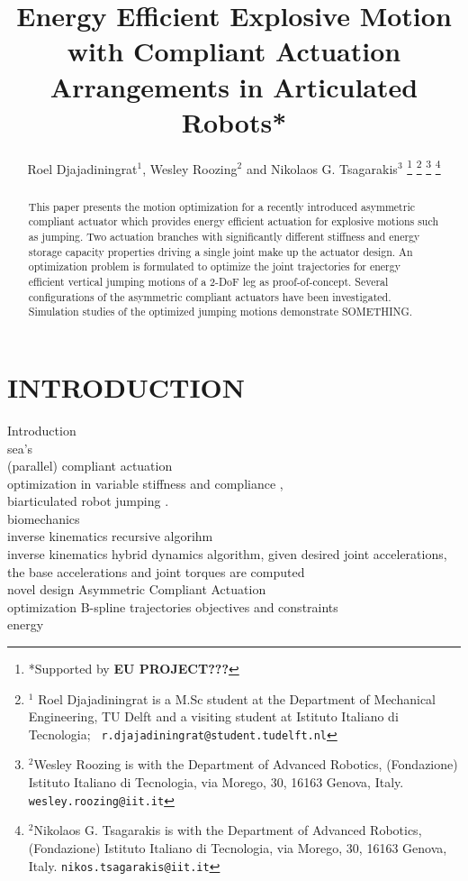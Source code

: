 \documentclass[letterpaper, 10 pt, conference]{ieeeconf}  %
\title{\LARGE \bf
Energy Efficient Explosive Motion with Compliant Actuation Arrangements in Articulated Robots*
}
\author{Roel Djajadiningrat$^{1}$, Wesley Roozing$^{2}$ and Nikolaos G. Tsagarakis$^{3}$%
\thanks{*Supported by \textbf{EU PROJECT???} }%
\thanks{$^{1}$ Roel Djajadiningrat is a M.Sc student at the Department of Mechanical Engineering, TU Delft and a visiting student at Istituto Italiano di Tecnologia;
        {\tt\ r.djajadiningrat@student.tudelft.nl}
  }%
\thanks{$^{2}$Wesley Roozing is with the Department of Advanced Robotics,
	(Fondazione) Istituto Italiano di Tecnologia, via Morego,
	30, 16163 Genova, Italy.
        {\tt\small wesley.roozing@iit.it}
     }%
\thanks{$^{2}$Nikolaos G. Tsagarakis is with the Department of Advanced Robotics,
	(Fondazione) Istituto Italiano di Tecnologia, via Morego,
	30, 16163 Genova, Italy.
	{\tt\small nikos.tsagarakis@iit.it}        
    }%
}
\begin{document}
\maketitle
\thispagestyle{empty}
\pagestyle{empty}


\begin{abstract}

This paper presents the motion optimization for a recently introduced asymmetric compliant actuator which provides energy efficient actuation for explosive motions such as jumping. Two actuation branches
with significantly different stiffness and energy storage capacity properties driving a single joint make up the actuator design. An optimization problem is formulated to optimize the joint trajectories for energy efficient vertical jumping motions of a 2-DoF leg as proof-of-concept. Several configurations of the asymmetric compliant actuators have been investigated. Simulation studies of the optimized jumping motions demonstrate SOMETHING. 

\end{abstract}


\section{INTRODUCTION}

Introduction  \\
sea's \cite{pratt1995series}\\
(parallel) compliant actuation \cite{yesilevskiy2015comparison} \cite{liu2015spear}\\
optimization in variable stiffness and compliance \cite{garabini2011optimality},\cite{velasco2013soft}   \\
biarticulated robot jumping \cite{babivc2009biarticulated}. \\
biomechanics \cite{niiyama2007mowgli}\\
inverse kinematics recursive algorihm \cite{wang1999weight} \cite{albro2000computation} \cite{albro2001optimal}\\
inverse kinematics hybrid dynamics algorithm, given desired joint accelerations, the base
accelerations and joint torques are computed \cite{nakanishi2007inverse} \\
novel design Asymmetric Compliant Actuation \cite{roozing2016design} \cite{roozing2016development} \\ 
optimization B-spline trajectories \cite{ude2000planning} \cite{babivc2009biarticulated}
objectives and constraints \cite{babivc2009biarticulated} \cite{kaphle2008optimality} \cite{wright1999numerical} \\
energy \cite{verstraten2016energy}
\end{document}
